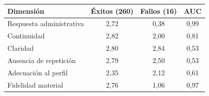 \begin{tabular}{lccc}\toprule
Dimensión & Éxitos (260) & Fallos (16) & AUC \\ \midrule
Respuesta administrativa & 2,72 & 0,38 & 0,99 \\
Continuidad & 2,82 & 2,00 & 0,81 \\
Claridad & 2,80 & 2,84 & 0,53 \\
Ausencia de repetición & 2,79 & 2,50 & 0,53 \\
Adecuación al perfil & 2,35 & 2,12 & 0,61 \\
Fidelidad material & 2,76 & 1,06 & 0,97 \\
\bottomrule\end{tabular}
